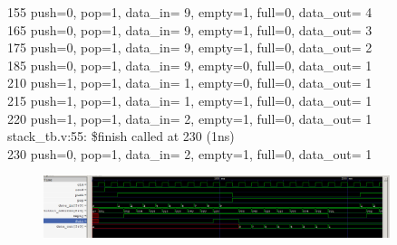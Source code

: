 \documentclass{perassignments}
\begin{document}
\begin{latin}
155    push=0, pop=1, data\_in= 9, empty=1, full=0, data\_out= 4\\
165    push=0, pop=1, data\_in= 9, empty=1, full=0, data\_out= 3\\
175    push=0, pop=1, data\_in= 9, empty=1, full=0, data\_out= 2\\
185    push=0, pop=1, data\_in= 9, empty=0, full=0, data\_out= 1\\
210    push=1, pop=1, data\_in= 1, empty=0, full=0, data\_out= 1\\
215    push=1, pop=1, data\_in= 1, empty=1, full=0, data\_out= 1\\
220    push=1, pop=1, data\_in= 2, empty=1, full=0, data\_out= 1\\
stack\_tb.v:55: \$finish called at 230 (1ns)\\
230    push=0, pop=1, data\_in= 2, empty=1, full=0, data\_out= 1
	\end{latin}
	\begin{figure}[H]
		\centering
		\includegraphics[width = 0.9\textwidth]{graphics/waveform.png}
	\end{figure}
\end{document}
